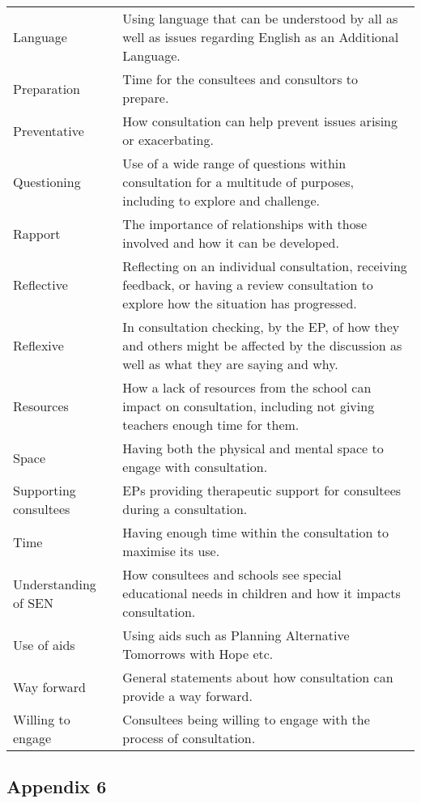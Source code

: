 \documentclass[
]{article}
\begin{document}
\begin{longtable}[]{@{}
  >{\raggedright\arraybackslash}p{}
  >{\raggedright\arraybackslash}p{}@{}}
Language & Using language that can be understood by all as well as
issues regarding English as an Additional Language. \\
Preparation & Time for the consultees and consultors to prepare. \\
Preventative & How consultation can help prevent issues arising or
exacerbating. \\
Questioning & Use of a wide range of questions within consultation for a
multitude of purposes, including to explore and challenge. \\
Rapport & The importance of relationships with those involved and how it
can be developed. \\
Reflective & Reflecting on an individual consultation, receiving
feedback, or having a review consultation to explore how the situation
has progressed. \\
Reflexive & In consultation checking, by the EP, of how they and others
might be affected by the discussion as well as what they are saying and
why. \\
Resources & How a lack of resources from the school can impact on
consultation, including not giving teachers enough time for them. \\
Space & Having both the physical and mental space to engage with
consultation. \\
Supporting consultees & EPs providing therapeutic support for consultees
during a consultation. \\
Time & Having enough time within the consultation to maximise its
use. \\
Understanding of SEN & How consultees and schools see special
educational needs in children and how it impacts consultation. \\
Use of aids & Using aids such as Planning Alternative Tomorrows with
Hope etc. \\
Way forward & General statements about how consultation can provide a
way forward. \\
Willing to engage & Consultees being willing to engage with the process
of consultation. \\
\bottomrule
\end{longtable}

\hypertarget{appendix-6}{%
\subsection{Appendix 6}\label{appendix-6}}
\end{document}
